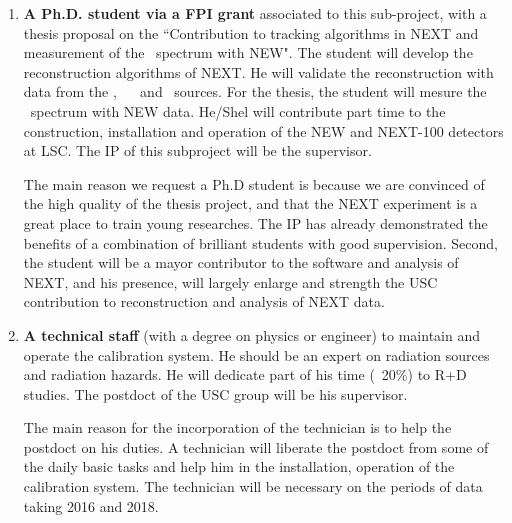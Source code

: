 \begin{enumerate}
\item {\bf A Ph.D. student via a FPI grant} associated to this sub-project, with a thesis proposal on the ``Contribution to tracking algorithms in NEXT and measurement of the \bb ~spectrum with NEW".
The student will develop the reconstruction algorithms of NEXT. He will validate the reconstruction with data from the \NA, ~\CS~ and \Tl ~sources. For the thesis, the student will mesure the \bb ~spectrum with NEW data.
He/Shel will contribute part time to the construction, installation and operation of the NEW and NEXT-100 detectors at LSC. The IP of this subproject will be the supervisor.

The main reason we request a Ph.D student is because we are convinced of the high quality of the thesis project, and 
that the NEXT experiment is a great place to train young researches. The IP has already demonstrated the benefits of a combination of brilliant students with good supervision. Second, the student will be a mayor contributor to the software and analysis of NEXT, and his presence, will largely enlarge and strength the USC contribution to reconstruction and analysis of NEXT data.

\item {\bf A technical staff} (with a degree on physics or engineer) to maintain and operate the calibration system. He should be an expert on radiation sources and radiation hazards. He will dedicate part of his time (~20\%) to R+D studies. The postdoct of the USC group will be his supervisor.

The main reason for the incorporation of the technician is to help the postdoct on his duties. A technician will liberate the postdoct from some of the daily basic tasks and help him in the installation, operation of the calibration system. The technician will be necessary on the periods of data taking 2016 and 2018.




\end{enumerate}
